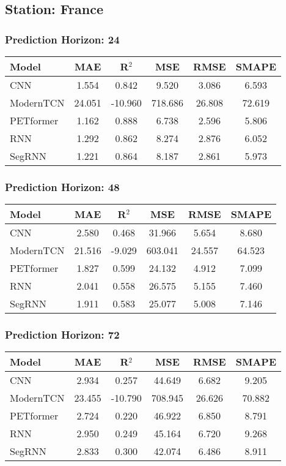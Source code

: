 \subsection*{Station: France}
\subsubsection*{Prediction Horizon: 24}
\begin{tabular}{lccccc}
\toprule
Model & MAE & R$^2$ & MSE & RMSE & SMAPE \\
\midrule
CNN & 1.554 & 0.842 & 9.520 & 3.086 & 6.593 \\
ModernTCN & 24.051 & -10.960 & 718.686 & 26.808 & 72.619 \\
PETformer & 1.162 & 0.888 & 6.738 & 2.596 & 5.806 \\
RNN & 1.292 & 0.862 & 8.274 & 2.876 & 6.052 \\
SegRNN & 1.221 & 0.864 & 8.187 & 2.861 & 5.973 \\
\bottomrule
\end{tabular}
\vspace{0.5cm}
\subsubsection*{Prediction Horizon: 48}
\begin{tabular}{lccccc}
\toprule
Model & MAE & R$^2$ & MSE & RMSE & SMAPE \\
\midrule
CNN & 2.580 & 0.468 & 31.966 & 5.654 & 8.680 \\
ModernTCN & 21.516 & -9.029 & 603.041 & 24.557 & 64.523 \\
PETformer & 1.827 & 0.599 & 24.132 & 4.912 & 7.099 \\
RNN & 2.041 & 0.558 & 26.575 & 5.155 & 7.460 \\
SegRNN & 1.911 & 0.583 & 25.077 & 5.008 & 7.146 \\
\bottomrule
\end{tabular}
\vspace{0.5cm}
\subsubsection*{Prediction Horizon: 72}
\begin{tabular}{lccccc}
\toprule
Model & MAE & R$^2$ & MSE & RMSE & SMAPE \\
\midrule
CNN & 2.934 & 0.257 & 44.649 & 6.682 & 9.205 \\
ModernTCN & 23.455 & -10.790 & 708.945 & 26.626 & 70.882 \\
PETformer & 2.724 & 0.220 & 46.922 & 6.850 & 8.791 \\
RNN & 2.950 & 0.249 & 45.164 & 6.720 & 9.268 \\
SegRNN & 2.833 & 0.300 & 42.074 & 6.486 & 8.911 \\
\bottomrule
\end{tabular}
\vspace{0.5cm}
